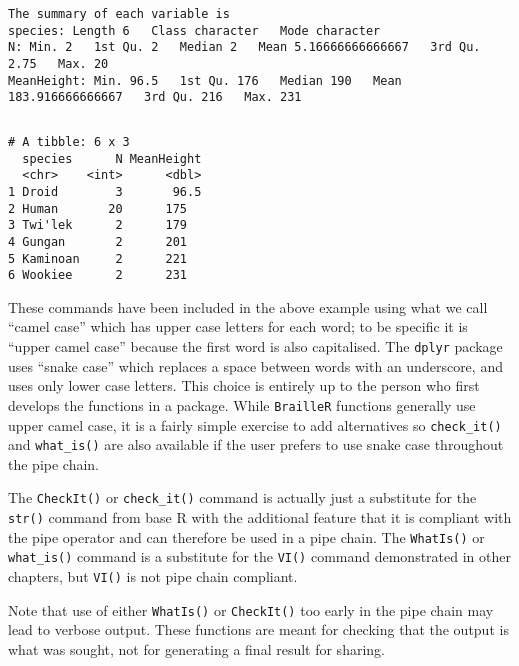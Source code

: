 \documentclass[
]{book}
\begin{document}
\begin{verbatim}
\end{verbatim}

\begin{verbatim}
The summary of each variable is
species: Length 6   Class character   Mode character  
N: Min. 2   1st Qu. 2   Median 2   Mean 5.16666666666667   3rd Qu. 2.75   Max. 20  
MeanHeight: Min. 96.5   1st Qu. 176   Median 190   Mean 183.916666666667   3rd Qu. 216   Max. 231  
\end{verbatim}

\begin{verbatim}
\end{verbatim}

\begin{verbatim}
# A tibble: 6 x 3
  species      N MeanHeight
  <chr>    <int>      <dbl>
1 Droid        3       96.5
2 Human       20      175  
3 Twi'lek      2      179  
4 Gungan       2      201  
5 Kaminoan     2      221  
6 Wookiee      2      231  
\end{verbatim}

These commands have been included in the above example using what we call ``camel case'' which has upper case letters for each word; to be specific it is ``upper camel case'' because the first word is also capitalised. The \texttt{dplyr} package uses ``snake case'' which replaces a space between words with an underscore, and uses only lower case letters. This choice is entirely up to the person who first develops the functions in a package. While \texttt{BrailleR} functions generally use upper camel case, it is a fairly simple exercise to add alternatives so \texttt{check\_it()} and \texttt{what\_is()} are also available if the user prefers to use snake case throughout the pipe chain.

The \texttt{CheckIt()} or \texttt{check\_it()} command is actually just a substitute for the \texttt{str()} command from base R with the additional feature that it is compliant with the pipe operator and can therefore be used in a pipe chain. The \texttt{WhatIs()} or \texttt{what\_is()} command is a substitute for the \texttt{VI()} command demonstrated in other chapters, but \texttt{VI()} is not pipe chain compliant.

Note that use of either \texttt{WhatIs()} or \texttt{CheckIt()} too early in the pipe chain may lead to verbose output. These functions are meant for checking that the output is what was sought, not for generating a final result for sharing.
\end{document}
